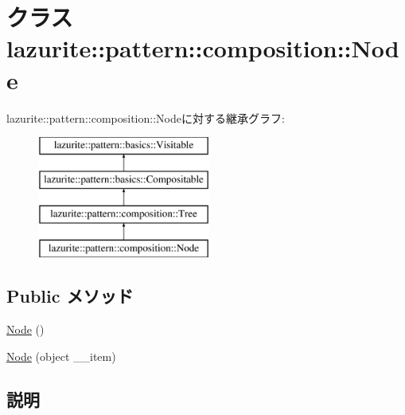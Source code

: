 \hypertarget{classlazurite_1_1pattern_1_1composition_1_1_node}{
\section{クラス lazurite::pattern::composition::Node}
\label{classlazurite_1_1pattern_1_1composition_1_1_node}
}
lazurite::pattern::composition::Nodeに対する継承グラフ:\begin{figure}[H]
\begin{center}
\leavevmode
\includegraphics[height=4cm]{classlazurite_1_1pattern_1_1composition_1_1_node}
\end{center}
\end{figure}
\subsection*{Public メソッド}
\begin{DoxyCompactItemize}
\item 
\hyperlink{classlazurite_1_1pattern_1_1composition_1_1_node_a9587eb952372f4516d5a57fa289ede48}{Node} ()
\item 
\hyperlink{classlazurite_1_1pattern_1_1composition_1_1_node_a85f9410474100c67c410408586764285}{Node} (object \_\-\_\-item)
\end{DoxyCompactItemize}


\subsection{説明}



